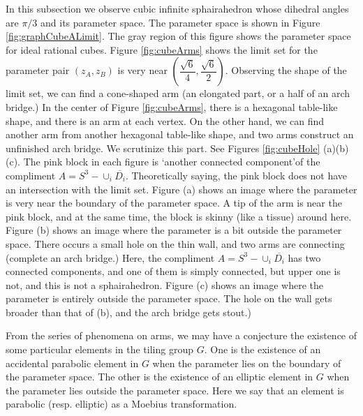 \documentclass[suppldata, dvipdfmx]{interact}
\theoremstyle{plain}%
\theoremstyle{definition}
\theoremstyle{remark}
\theoremstyle{problemstyle}
\begin{document}
In this subsection we observe cubic infinite sphairahedron whose
dihedral angles are $\pi / 3$ and its parameter space.
The parameter space is shown in Figure \ref{fig:graphCubeALimit}.
The gray region of this figure shows the parameter space for ideal rational cubes. 
Figure \ref{fig:cubeArms} shows the limit set for the parameter pair $(z_A, z_B)$ is very near $\left( \dfrac{\sqrt{6}}{4}, \dfrac{\sqrt{6}}{2} \right)$.
Observing the shape of the limit set, we can find a cone-shaped arm (an elongated part, or a half of an arch bridge.)
In the center of Figure \ref{fig:cubeArms}, there is a hexagonal table-like shape, and there is an arm at each vertex.
On the other hand, we can find another arm from another hexagonal table-like shape, and two arms construct an unfinished arch bridge.
We scrutinize this part.  See Figures \ref{fig:cubeHole} (a)(b)(c).  The pink block in each figure is \lq another connected component\rq of the compliment $A=S^3-\cup_i\overline{D_i}$.  Theoretically saying, the pink block does not have an intersection with the limit set.  
Figure (a) shows an image where the parameter is very near the boundary of the parameter space.  A tip of the arm is near the pink block, and at the same time, the block is skinny (like a tissue) around here.
Figure (b) shows an image where the parameter is a bit outside the parameter space.  There occurs a small hole on the thin wall, and two arms are connecting (complete an arch bridge.)  Here, the compliment $A=S^3-\cup_i\overline{D_i}$ has two connected components, and one of them is simply connected, but upper one is not, and this is not a sphairahedron.
Figure (c) shows an image where the parameter is entirely outside the parameter space.  The hole on the wall gets broader than that of (b), and the arch bridge gets stout.)   

From the series of phenomena on arms, we may have a conjecture the existence of some particular elements in the tiling group $G$.  
One is the existence of an accidental parabolic element in $G$ when the parameter lies on the boundary of the parameter space.  
The other is the existence of an elliptic element in $G$ when the parameter lies outside the parameter space.  Here we say that an element is parabolic (resp. elliptic) as a Moebius transformation. 
\end{document}
